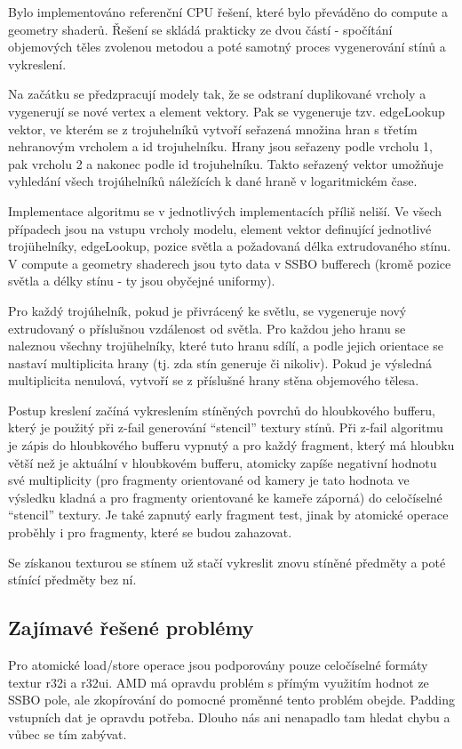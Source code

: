\documentclass[a4paper, 12pt]{article}
\begin{document}
Bylo implementováno referenční CPU řešení, které bylo převáděno do compute a geometry shaderů.
Řešení se skládá prakticky ze dvou částí - spočítání objemových těles zvolenou metodou a poté
samotný proces vygenerování stínů a vykreslení.

Na začátku se předzpracují modely tak, že se odstraní duplikované vrcholy a vygenerují se nové
vertex a element vektory. Pak se vygeneruje tzv. edgeLookup vektor, ve kterém se z trojuhelníků 
vytvoří seřazená množina hran s třetím nehranovým vrcholem a id trojuhelníku. Hrany jsou seřazeny
 podle vrcholu 1, pak vrcholu 2 a nakonec podle id trojuhelníku. Takto seřazený vektor umožňuje vyhledání všech trojúhelníků náležících k dané hraně v logaritmickém čase.

Implementace algoritmu se v jednotlivých implementacích příliš neliší. Ve všech případech jsou na
vstupu vrcholy modelu, element vektor definující jednotlivé trojühelníky, edgeLookup, pozice světla a 
požadovaná délka extrudovaného stínu. V compute a geometry shaderech jsou tyto data v SSBO bufferech
(kromě pozice světla a délky stínu - ty jsou obyčejné uniformy).
 
Pro každý trojúhelník, pokud je přivrácený ke světlu, se vygeneruje nový extrudovaný o příslušnou vzdálenost
od světla. Pro každou jeho hranu se naleznou všechny trojühelníky, které tuto hranu sdílí, a podle jejich orientace se nastaví multiplicita hrany (tj. zda stín generuje či nikoliv).
Pokud je výsledná multiplicita nenulová, vytvoří se z příslušné hrany stěna objemového tělesa.



Postup kreslení začíná vykreslením stíněných povrchů do hloubkového bufferu, který je použitý při 
z-fail generování ``stencil'' textury stínů. Při z-fail algoritmu je zápis do hloubkového bufferu vypnutý
a pro každý fragment, který má hloubku větší než je aktuální v hloubkovém bufferu, atomicky zapíše negativní
hodnotu své multiplicity (pro fragmenty orientované od kamery je tato hodnota ve výsledku kladná a pro
fragmenty orientované ke kameře záporná) do celočíselné ``stencil'' textury. Je také zapnutý early fragment test,
jinak by atomické operace proběhly i pro fragmenty, které se budou zahazovat.

Se získanou texturou se stínem už stačí vykreslit znovu stíněné předměty a poté stínící předměty bez ní.

\subsection{Zajímavé řešené problémy}
Pro atomické load/store operace jsou podporovány pouze celočíselné formáty textur r32i a r32ui.
AMD má opravdu problém s přímým využitím hodnot ze SSBO pole, ale zkopírování do pomocné proměnné tento problém obejde.
Padding vstupních dat je opravdu potřeba. Dlouho nás ani nenapadlo tam hledat chybu a vůbec se tím zabývat. 
\end{document}
